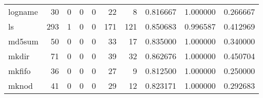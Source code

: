 \begin{tabular}{lrrrrrrrrr}
logname   &                                        30 &                                                  0 &                                                  0 &                                                  0 &                                                 22 &                                                  8 &                                           0.816667 &                               1.000000 &                             0.266667 \\
ls        &                                       293 &                                                  1 &                                                  0 &                                                  0 &                                                171 &                                                121 &                                           0.850683 &                               0.996587 &                             0.412969 \\
md5sum    &                                        50 &                                                  0 &                                                  0 &                                                  0 &                                                 33 &                                                 17 &                                           0.835000 &                               1.000000 &                             0.340000 \\
mkdir     &                                        71 &                                                  0 &                                                  0 &                                                  0 &                                                 39 &                                                 32 &                                           0.862676 &                               1.000000 &                             0.450704 \\
mkfifo    &                                        36 &                                                  0 &                                                  0 &                                                  0 &                                                 27 &                                                  9 &                                           0.812500 &                               1.000000 &                             0.250000 \\
mknod     &                                        41 &                                                  0 &                                                  0 &                                                  0 &                                                 29 &                                                 12 &                                           0.823171 &                               1.000000 &                             0.292683 \\

\end{tabular}
